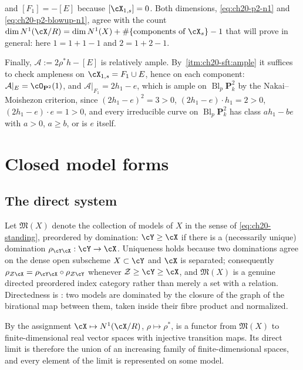 \begin{example}
and $[F_1]=-[E]$ because $[\cX_{1,s}]=0$.  Both dimensions,
\eqref{eq:ch20-p2-n1} and \eqref{eq:ch20-p2-blowup-n1}, agree with the count
$\dim N^1(\cX/R)=\dim N^1(X)+\#\{\text{components of }\cX_s\}-1$ that
 will prove in general: here
$1=1+1-1$ and $2=1+2-1$.

Finally, $\mathcal A:=2\rho^*h-[E]$ is relatively ample.  By
\,\cref{itm:ch20-sft:ample} it suffices to
check ampleness on $\cX_{1,s}=F_1\cup E$, hence on each component:
$\mathcal A|_E=\cO_{\mathbf P^2}(1)$, and
$\mathcal A|_{F_1}=2h_1-e$, which is ample on
$\operatorname{Bl}_p\mathbf P^2_k$ by the Nakai--Moishezon criterion, since
$(2h_1-e)^2=3>0$, $(2h_1-e)\cdot h_1=2>0$, $(2h_1-e)\cdot e=1>0$, and
every irreducible curve on $\operatorname{Bl}_p\mathbf P^2_k$ has class
$ah_1-be$ with $a>0$, $a\ge b$, or is $e$ itself.
\end{example}

\section{Closed model forms}
\label{sec:ch20-model-forms}

\subsection{The direct system}
\label{sec:ch20-direct-system}

Let $\mathfrak M(X)$ denote the collection of models of $X$ in the sense
of \eqref{eq:ch20-standing}, preordered by domination: $\cY\geq\cX$ if
there is a (necessarily unique) domination $\rho_{\cY\cX}:\cY\to\cX$.
Uniqueness holds because two dominations agree on the dense open subscheme
$X\subset\cY$ and $\cX$ is separated; consequently
$\rho_{\mathcal Z\cX}=\rho_{\cY\cX}\circ\rho_{\mathcal Z\cY}$ whenever
$\mathcal Z\geq\cY\geq\cX$, and $\mathfrak M(X)$ is a genuine directed
preordered index category rather than merely a set with a relation.
Directedness is : two models are dominated by
the closure of the graph of the birational map between them, taken inside
their fibre product and normalized.

By  the assignment
$\cX\mapsto N^1(\cX/R)$, $\rho\mapsto\rho^*$, is a functor from
$\mathfrak M(X)$ to finite-dimensional real vector spaces with injective
transition maps.  Its direct limit is therefore the union of an increasing
family of finite-dimensional spaces, and every element of the limit is
represented on some model.

